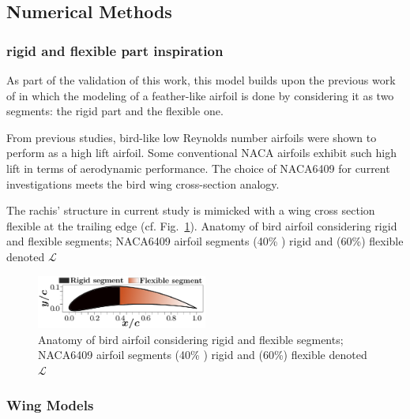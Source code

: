 \documentclass[conf]{new-aiaa}
\begin{document}
\subsection{Numerical Methods}
\subsubsection{rigid and flexible part inspiration}
As part of the validation of this work, this model builds upon the previous work of \citet{gamble2020load} in which the modeling of a feather-like airfoil is done by considering it as two segments: the rigid part and the flexible one.

From previous studies, bird-like low Reynolds number airfoils \cite{Boughou2022NumericalAirfoils} were shown to perform as a high lift airfoil.
%
Some conventional NACA airfoils exhibit such high lift in terms of aerodynamic performance.
%
The choice of NACA6409 for current investigations meets the bird wing cross-section analogy.
%

The rachis' structure in current study is mimicked with a wing cross section flexible at the trailing edge (cf. Fig.~\ref{fig:segments}).
%
Anatomy of bird airfoil considering rigid and flexible segments; NACA6409 airfoil segments (40\% ) rigid and (60\%) flexible denoted $\mathcal{L}$

\begin{figure}[ht!]
\centering
\includegraphics[width=0.5\textwidth]{figs/segments_airfoil.pdf}
\caption{Anatomy of bird airfoil considering rigid and flexible segments; NACA6409 airfoil segments (40\% ) rigid and (60\%) flexible denoted $\mathcal{L}$}
\label{fig:segments}
\end{figure}
\subsubsection{Wing Models}
\end{document}
